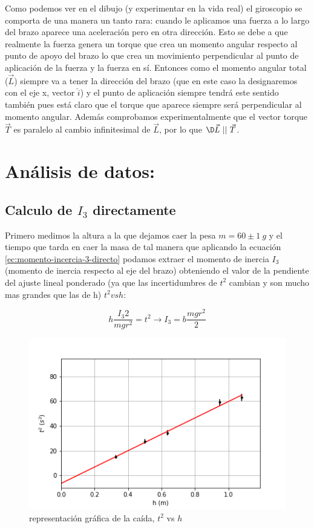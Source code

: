 \documentclass[12pt,a4paper]{article}
\begin{document}
Como podemos ver en el dibujo (y experimentar en la vida real) el giroscopio se comporta de una manera un tanto rara: cuando le aplicamos una fuerza a lo largo del brazo aparece una aceleración pero en otra dirección. Esto se debe a que realmente la fuerza genera un torque que crea un momento angular respecto al punto de apoyo del brazo lo que crea un movimiento perpendicular al punto de aplicación de la fuerza y la fuerza en sí. Entonces como el momento angular total ($\vec{L}$) siempre va a tener la dirección del brazo (que en este caso la designaremos con el eje x, vector $\hat{i}$) y el punto de aplicación siempre tendrá este sentido también pues está claro que el torque que aparece siempre será perpendicular al momento angular. Además comprobamos experimentalmente que el vector torque $\vec{T}$  es paralelo al cambio infinitesimal de $\vec{L}$, por lo que $\D \vec{L} \ || \ \vec{T}$.
\section{Análisis de datos:}

\subsection{Calculo de $I_3$  directamente}

Primero medimos la altura a la que dejamos caer la pesa $m=60 \pm 1 \ g$  y el tiempo que tarda en caer la masa de tal manera que aplicando la ecuación \ref{ec:momento-incercia-3-directo} podamos extraer el momento de inercia $I_3$ (momento de inercia respecto al eje del brazo) obteniendo el valor de la pendiente del ajuste lineal ponderado (ya que las incertidumbres de $t^2$ cambian y son mucho mas grandes que las de h) $t^2 vs h$: 

\begin{equation}
h \dfrac{I_3 2}{m g r^2} = t^2 \longrightarrow I_3 = b \dfrac{m g r^2}{2}
\label{ec:momento-incercia-3-directo}
\end{equation}


\begin{figure}[h!] \centering
\includegraphics[scale=1]{plot-aceleracion.png}
\caption{representación gráfica de la caída, $t^2$ vs $h$}
\end{figure}
\end{document}
